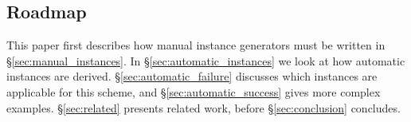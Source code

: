 \documentclass{llncs}
\begin{document}
\subsection{Roadmap}

This paper first describes how manual instance generators must be written in \S\ref{sec:manual_instances}. In \S\ref{sec:automatic_instances} we look at how automatic instances are derived. \S\ref{sec:automatic_failure} discusses which instances are applicable for this scheme, and \S\ref{sec:automatic_success} gives more complex examples. \S\ref{sec:related} presents related work, before \S\ref{sec:conclusion} concludes.


\begin{comment}
\section{Manual Instance Generators}
\label{sec:manual_instances}

There are currently three mechanisms for specifying and invoking instance generators -- all offering different levels of compiler integration and extensibility.

\subsection{Built in deriving}

The simplest instance generator is provided by Haskell itself, with the |deriving| keyword. The |Eq| instance given above could have been automatically derived by the compiler, simply by adding |deriving Eq| at the end of the data type declaration.

Unfortunately this scheme has two primary disadvantages. Firstly, the deriving keyword \textit{must} appear after the data type declaration -- if the data type is declared in a library, a new instance may not be derived. Secondly, only six inbuilt type classes are supported -- there is no way to add more.

\subsection{The DrIFT tool}

The DrIFT tool \cite{drift} is a Haskell preprocessor -- which examines a source file for special annotations, and appends the code for requested instances. DrIFT has support for 29 instance generators, but adding more requires making modifications to DrIFT itself.


\end{comment}
\end{document}
